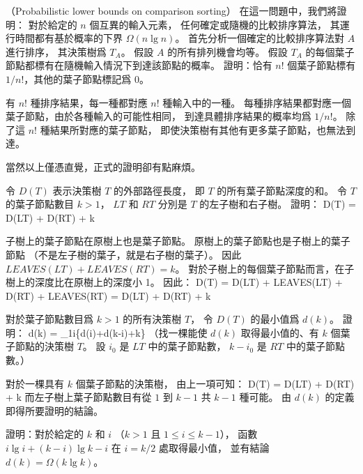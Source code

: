 \startPROBLEM
（Probabilistic lower bounds on comparison sorting）
在這一問題中，我們將證明：
對於給定的 $n$ 個互異的輸入元素，
任何確定或隨機的比較排序算法，
其運行時間都有基於概率的下界 $\Omega(n\lg{n})$。
首先分析一個確定的比較排序算法對 $A$ 進行排序，
其決策樹爲 $T_A$。
假設 $A$ 的所有排列機會均等。
\startigBase[a]\startitem
假設 $T_A$ 的每個葉子節點都標有在隨機輸入情況下到達該節點的概率。
證明：恰有 $n!$ 個葉子節點標有 $1/n!$，其他的葉子節點標記爲 $0$。
\stopitem\stopigBase

\startANSWER
有 $n!$ 種排序結果，每一種都對應 $n!$ 種輸入中的一種。
每種排序結果都對應一個葉子節點，由於各種輸入的可能性相同，
到達具體排序結果的概率均爲 $1/n!$。
除了這 $n!$ 種結果所對應的葉子節點，
即使決策樹有其他有更多葉子節點，也無法到達。

當然以上僅憑直覺，正式的證明卻有點麻煩。
\stopANSWER

\startigBase[a,continue]\startitem
令 $D(T)$ 表示決策樹 $T$ 的外部路徑長度，
即 $T$ 的所有葉子節點深度的和。
令 $T$ 的葉子節點數目 $k>1$，
 $LT$ 和 $RT$ 分別是 $T$ 的左子樹和右子樹。
證明：
\startformula
D(T) = D(LT) + D(RT) + k
\stopformula
\stopitem\stopigBase

\startANSWER
子樹上的葉子節點在原樹上也是葉子節點。
原樹上的葉子節點也是子樹上的葉子節點
（不是左子樹的葉子，就是右子樹的葉子）。
因此 $LEAVES(LT) + LEAVES(RT) = k$。
對於子樹上的每個葉子節點而言，在子樹上的深度比在原樹上的深度小 1。
因此：
\startsplitformula\startmathalignment
\NC D(T) \NC = D(LT) + LEAVES(LT) + D(RT) + LEAVES(RT) \NR
\NC      \NC = D(LT) + D(RT) + k \NR
\stopmathalignment\stopsplitformula
\stopANSWER

\startigBase[a,continue]\startitem
對於葉子節點數目爲 $k>1$ 的所有決策樹 $T$，
令 $D(T)$ 的最小值爲 $d(k)$。
證明：
\startformula
d(k) = \min_{1\le i}\left\{d(i)+d(k-i)+k\right\}
\stopformula
（\hint 找一棵能使 $d(k)$ 取得最小值的、有 $k$ 個葉子節點的決策樹 $T$。
設 $i_0$ 是 $LT$ 中的葉子節點數， $k-i_0$ 是 $RT$ 中的葉子節點數。）
\stopitem\stopigBase

\startANSWER
對於一棵具有 $k$ 個葉子節點的決策樹，
由上一項可知：
\startformula
D(T) = D(LT) + D(RT) + k
\stopformula
而左子樹上葉子節點數目有從 $1$ 到 $k-1$ 共 $k-1$ 種可能。
由 $d(k)$ 的定義即得所要證明的結論。
\stopANSWER

\startigBase[a,continue]\startitem
證明：對於給定的 $k$ 和 $i$ （$k>1$ 且 $1\le i\le {k-1}$），
函數 $i\lg{i}+(k-i)\lg{k-i}$ 在 $i=k/2$ 處取得最小值，
並有結論 $d(k)=\Omega(k\lg{k})$。
\stopitem\stopigBase

